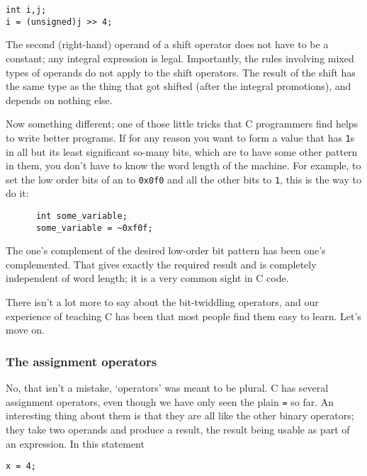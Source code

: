     \begin{Verbatim}
int i,j;
i = (unsigned)j >> 4;
\end{Verbatim}

    The second (right-hand) operand of a shift operator does not have to be
     a constant; any integral expression is legal. Importantly, the rules
     involving mixed types of operands do not apply to the shift operators.
     The result of the shift has the same type as the thing that got shifted
     (after the integral promotions), and depends on nothing else.


    Now something different; one of those little tricks that
     C programmers find helps to write better programs. If for any reason
     you want to form a value that has \texttt{1}s in all but its
     least significant so-many bits, which are to have some other pattern in
     them, you don't have to know the word length of the machine. For example,
     to set the low order bits of an \kint{}
     to \texttt{0x0f0} and all the other bits to \texttt{1},
     this is the way to do it:


    \begin{Verbatim}
      int some_variable;
      some_variable = ~0xf0f;
    \end{Verbatim}

    The one's complement of the desired low-order bit pattern has been
     one's complemented. That gives exactly the required result and is
     completely independent of word length; it is a very common sight in
     C code.


    There isn't a lot more to say about the bit-twiddling operators, and
     our experience of teaching C has been that most people find them
     easy to learn. Let's move on.


   

   \subsubsection{The assignment operators}
    

    No, that isn't a mistake, `operators' was meant to be plural.
     C has several assignment operators, even though we have only seen
     the plain \texttt{=} so far. An interesting thing about them is
     that they are all like the other binary operators; they take two operands
     and produce a result, the result being usable as part of an expression.
     In this statement


    \begin{Verbatim}
x = 4;
\end{Verbatim}

